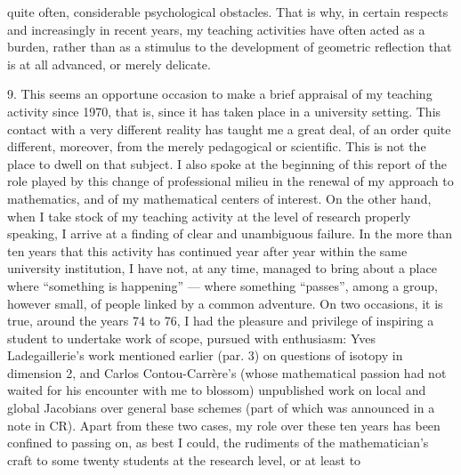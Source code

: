 
quite often, considerable psychological obstacles. That is why,
in certain respects and increasingly in recent years,
my teaching activities have often acted as a burden,
rather than as a stimulus to the development of geometric
reflection that is at all advanced, or merely delicate.

9. This seems an opportune occasion to make a brief
appraisal of my teaching activity since 1970, that is, since
it has taken place in a university setting. This contact
with a very different reality has taught me a great
deal, of an order quite different, moreover, from the
merely pedagogical or scientific. This is not the place to
dwell on that subject. I also spoke at the beginning of this report of the
role played by this change of professional milieu in the
renewal of my approach to mathematics, and of my
mathematical centers of interest. On the other hand, when I take stock
of my teaching activity at the level of research properly
speaking, I arrive at a finding of clear and unambiguous failure. In the more
than ten years that this activity has continued year after year within
the same university institution, I have not, at any time, managed
to bring about a place where ``something is happening'' --- where something
``passes'', among a group, however small, of people
linked by a common adventure. On two occasions, it is true, around
the years 74 to 76, I had the pleasure and privilege of inspiring
a student to undertake work of scope, pursued with enthusiasm:
Yves Ladegaillerie's work mentioned earlier (par. 3) on
questions of isotopy in dimension 2, and Carlos Contou-Carrère's
(whose mathematical passion had not waited for his encounter
with me to blossom) unpublished work on local and global
Jacobians over general base schemes (part of which
was announced in a note in CR). Apart from these two cases,
my role over these ten years has been confined to passing on,
as best I could, the rudiments of the mathematician's craft to some
twenty students at the research level, or at least to

